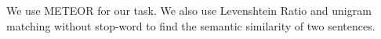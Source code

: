 We use METEOR for our task. We also use Levenshtein Ratio and unigram matching without stop-word to find the semantic similarity of two sentences.
